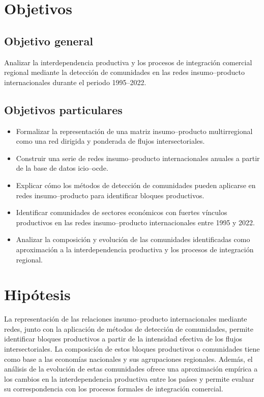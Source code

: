 \section{Objetivos}

\subsection{Objetivo general}

Analizar la interdependencia productiva y los procesos de integración comercial regional mediante la detección de comunidades en las redes insumo--producto internacionales durante el periodo 1995--2022.

\subsection{Objetivos particulares}

\begin{itemize}
    \item Formalizar la representación de una matriz insumo--producto multirregional como una red dirigida y ponderada de flujos intersectoriales.
    \item Construir una serie de redes insumo--producto internacionales anuales a partir de la base de datos  \acrshort{icio}--\gls{ocde}.
    \item Explicar cómo los métodos de detección de comunidades pueden aplicarse en redes insumo--producto para identificar bloques productivos.
    \item Identificar comunidades de sectores económicos con fuertes vínculos productivos en las redes insumo--producto internacionales entre 1995 y 2022.
    \item Analizar la composición y evolución de las comunidades identificadas como aproximación a la interdependencia productiva y los procesos de integración regional.
\end{itemize}

\section{Hipótesis}

La representación de las relaciones insumo--producto internacionales mediante redes, junto con la aplicación de métodos de detección de comunidades, permite identificar bloques productivos a partir de la intensidad efectiva de los flujos intersectoriales. La composición de estos bloques productivos o comunidades tiene como base a las economías nacionales y sus agrupaciones regionales. Además, el análisis de la evolución de estas comunidades ofrece una aproximación empírica a los cambios en la interdependencia productiva entre los países y permite evaluar su correspondencia con los procesos formales de integración comercial.